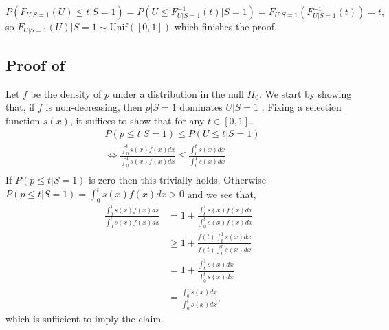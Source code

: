 \documentclass{article}
\begin{document}
\begin{appendix}
\[P(F_{U|S = 1}(U) \leq t | S=1) = P(U \leq F_{U|S = 1}^{-1}(t) | S=1) = F_{U|S=1}(F_{U|S = 1}^{-1}(t)) = t,\]
so  $F_{U|S = 1}(U) | S = 1 \sim \text{Unif}([0, 1])$ which finishes the proof. 
 
\subsection{Proof of }
Let $f$ be the density of $p$ under a distribution in the null $H_0$. We start by showing that, if $f$ is non-decreasing, then $p |S =1$ dominates $U | S=1$ . Fixing a selection function $s(x)$, it suffices to show that for any $t \in [0, 1]$. 
    \begin{align*}
        &P(p \leq t | S =1) \leq P(U \leq t | S= 1)\\
        &\iff 
        \frac{\int_{0}^{t} s(x) f(x) dx }{\int_{0}^{1} s(x) f(x) dx } \leq \frac{\int_{0}^{t} s(x) dx}{\int_{0}^{1} s(x) dx } \\
    \end{align*}
If $P( p \leq t | S = 1)$ is zero then this trivially holds. Otherwise $P( p \leq t | S = 1) = \int_{0}^{t} s(x) f(x) dx  > 0$ and we see that, 
    \begin{align*}
        \frac{ \int_{0}^{1} s(x) f(x) dx }{\int_{0}^{t} s(x) f(x) dx } &= 1 + \frac{\int_{t}^{1} s(x) f(x) dx }{\int_{0}^{t} s(x) f(x) dx }\\
        &\geq 1 + \frac{f(t)\int_{t}^{1} s(x) dx }{f(t)\int_{0}^{t} s(x)  dx }\\
        &= 1 + \frac{\int_{t}^{1} s(x) dx }{\int_{0}^{t} s(x)  dx }\\
        &= \frac{ \int_{0}^{1} s(x) dx }{\int_{0}^{t} s(x)  dx },
    \end{align*}
which is sufficient to imply the claim. 


\end{appendix}
\end{document}
